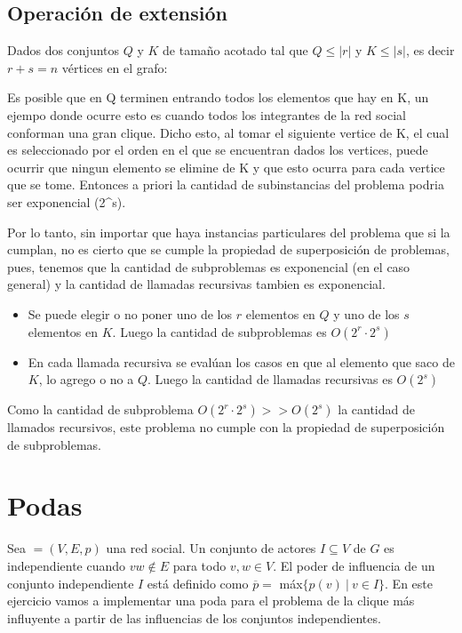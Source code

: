 \documentclass[10pt, a4paper]{article}
\begin{document}
\subsection{Operación de extensión}

Dados dos conjuntos $Q$ y $K$ de tamaño acotado tal que $Q \leq |r|$ y $K \leq |s|$, es decir $r+s = n$ vértices en el grafo:

Es posible que en Q terminen entrando todos los elementos que hay en K, un ejempo donde ocurre esto es cuando todos los integrantes de la red social conforman una gran clique. Dicho esto, al tomar el siguiente vertice de K, el cual es seleccionado por el orden en el que se encuentran dados los vertices, puede ocurrir que ningun elemento se elimine de K y que esto ocurra para cada vertice que se tome. Entonces a priori la cantidad de subinstancias del problema podria ser exponencial (2^s).

Por lo tanto, sin importar que haya instancias particulares del problema que si la cumplan, no es cierto que se cumple la propiedad de superposición de problemas, pues, tenemos que la cantidad de subproblemas es exponencial (en el caso general) y la cantidad de llamadas recursivas tambien es exponencial.

\begin{itemize}
\item Se puede elegir o no poner uno de los $r$ elementos en $Q$ y uno de los $s$ elementos en $K$. Luego la cantidad de subproblemas es $O(2^r \cdot 2^s)$
\item En cada llamada recursiva se evalúan los casos en que al elemento que saco de $K$, lo agrego o no a $Q$. Luego la cantidad de llamadas recursivas es $O(2^s)$
\end{itemize}

Como la cantidad de subproblema $O(2^r \cdot 2^s) >> O(2^s)$ la cantidad de llamados recursivos, este problema no cumple con la propiedad de superposición de subproblemas.

\section{Podas}
Sea $ = (V, E, p)$ una red social. Un conjunto de actores $I \subseteq V$ de $G$ es independiente cuando
$vw \notin E$ para todo $v, w \in V$. El poder de influencia de un conjunto independiente $I$ está definido como
$\overline{p} =$ máx$\{p(v) \ | \ v \in I\}$. En este ejercicio vamos a implementar una poda para el problema de la
clique más influyente a partir de las influencias de los conjuntos independientes.
\end{document}
